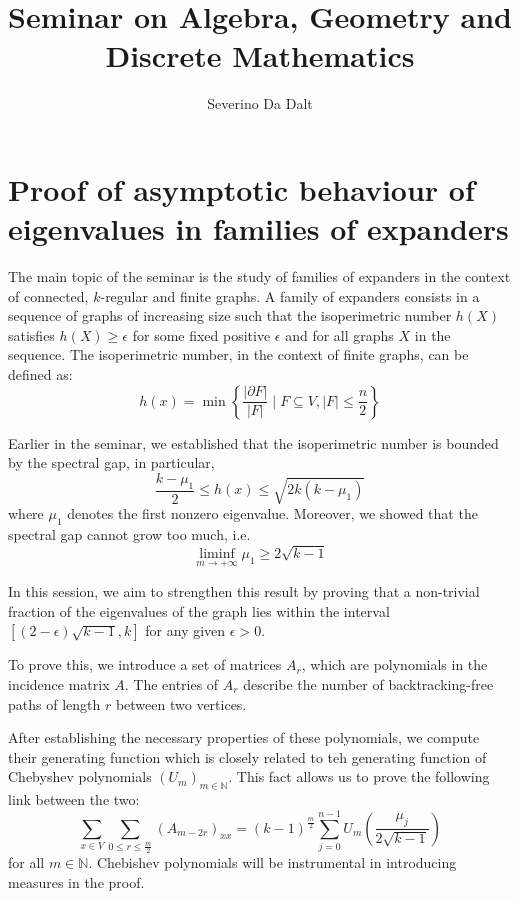 \documentclass[11pt]{article}
\title{Seminar on Algebra, Geometry and Discrete Mathematics}
\author{Severino Da Dalt}
\theoremstyle{definition}
\begin{document}
    \maketitle

    \section{Proof of asymptotic behaviour of eigenvalues in families of expanders}\label{sec:section}
    The main topic of the seminar is the study of families of expanders in the context of connected, $k$-regular and finite graphs.
    A family of expanders consists in a sequence of graphs of increasing size such that the isoperimetric number $h(X)$ satisfies $h(X) \geq \epsilon$
    for some fixed positive $\epsilon$ and for all graphs $X$ in the sequence.
    The isoperimetric number, in the context of finite graphs, can be defined as:
    $$h(x) = \min{ \left\{ \frac{|\partial F|}{|F|} \mid F \subseteq V, |F| \leq \frac{n}{2}\right\} }$$

    Earlier in the seminar, we established that the isoperimetric number is bounded by the spectral gap, in particular,
    $$\frac{k - \mu_1}{2} \leq h(x) \leq \sqrt{2k(k - \mu_1)}$$
    where $\mu_1$ denotes the first nonzero eigenvalue.
    Moreover, we showed that the spectral gap cannot grow too much, i.e.
    $$\liminf\limits_{m \rightarrow +\infty}\mu_1 \geq 2 \sqrt{k-1}$$

    In this session, we aim to strengthen this result by proving that a non-trivial fraction of the eigenvalues of the
    graph lies within the interval $[(2 - \epsilon) \sqrt{k-1}, k]$ for any given $\epsilon > 0$.
    \newline

    To prove this, we introduce a set of matrices $A_r$, which are polynomials in the incidence matrix $A$.
    The entries of $A_r$ describe the number of backtracking-free paths of length $r$ between two vertices.
    \newline

    After establishing the necessary properties of these polynomials, we compute their generating function which
    is closely related to teh generating function of Chebyshev polynomials $(U_m)_{m\in \mathbb{N}}$.
    This fact allows us to prove the following link between the two:
    $$\sum_{x \in V} \sum_{0\leq r \leq\frac{m}{2}} \left(A_{m-2r}\right)_{xx} = (k-1)^{\frac{m}{2}} \sum_{j=0}^{n-1} U_m\left(\frac{\mu_j}{2\sqrt{k-1}}\right)$$
    for all $m \in \mathbb{N}$.
    Chebishev polynomials will be instrumental in introducing measures in the proof.
    \newline
\end{document}
